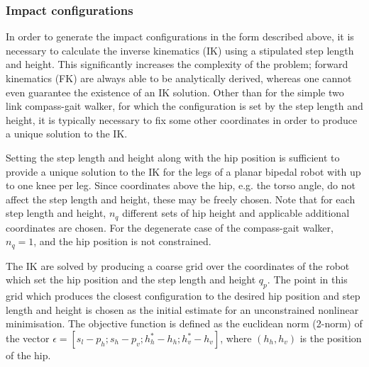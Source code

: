 \subsubsection{Impact configurations}
In order to generate the impact configurations in the form described above, it is necessary to calculate the inverse kinematics (IK) using a stipulated step length and height. This significantly increases the complexity of the problem; forward kinematics (FK) are always able to be analytically derived, whereas one cannot even guarantee the existence of an IK solution. Other than for the simple two link compass-gait walker, for which the configuration is set by the step length and height, it is typically necessary to fix some other coordinates in order to produce a unique solution to the IK. %

Setting the step length and height along with the hip position is sufficient to provide a unique solution to the IK for the legs of a planar bipedal robot with up to one knee per leg. Since coordinates above the hip, e.g. the torso angle, do not affect the step length and height, these may be freely chosen. Note that for each step length and height, $n_q$ different sets of hip height and applicable additional coordinates are chosen. For the degenerate case of the compass-gait walker, $n_q=1$, and the hip position is not constrained.

The IK are solved by producing a coarse grid over the coordinates of the robot which set the hip position and the step length and height $q_p$. The point in this grid which produces the closest configuration to the desired hip position and step length and height is chosen as the initial estimate for an unconstrained nonlinear minimisation. The objective function is defined as the euclidean norm (2-norm) of the vector $\epsilon = [s_l-p_h; s_h-p_v; h_h^*-h_h; h_v^*-h_v]$, where $(h_h, h_v)$ is the position of the hip.

